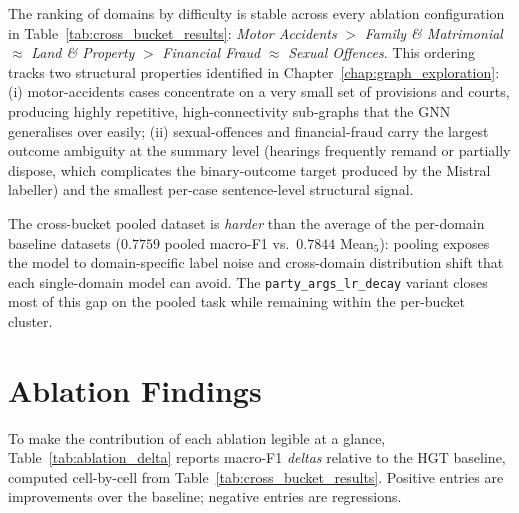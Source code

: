 The ranking of domains by difficulty is stable across every ablation
configuration in Table~\ref{tab:cross_bucket_results}:
\textit{Motor Accidents} $>$ \textit{Family \& Matrimonial}
$\approx$ \textit{Land \& Property} $>$ \textit{Financial Fraud}
$\approx$ \textit{Sexual Offences}. This ordering tracks two
structural properties identified in
Chapter~\ref{chap:graph_exploration}: (i) motor-accidents cases
concentrate on a very small set of provisions and courts, producing
highly repetitive, high-connectivity sub-graphs that the GNN
generalises over easily; (ii) sexual-offences and financial-fraud
carry the largest outcome ambiguity at the summary level (hearings
frequently remand or partially dispose, which complicates the
binary-outcome target produced by the Mistral labeller) and the
smallest per-case sentence-level structural signal.

The cross-bucket pooled dataset is \emph{harder} than the average of
the per-domain baseline datasets ($0.7759$ pooled macro-F1 vs.\
$0.7844$ Mean$_5$): pooling exposes the model to domain-specific
label noise and cross-domain distribution shift that each
single-domain model can avoid. The \texttt{party\_args\_lr\_decay}
variant closes most of this gap on the pooled task while remaining
within the per-bucket cluster.

\section{Ablation Findings}
\label{sec:ablation_findings}

To make the contribution of each ablation legible at a glance,
Table~\ref{tab:ablation_delta} reports macro-F1 \emph{deltas}
relative to the HGT baseline, computed cell-by-cell from
Table~\ref{tab:cross_bucket_results}. Positive entries are
improvements over the baseline; negative entries are regressions.

